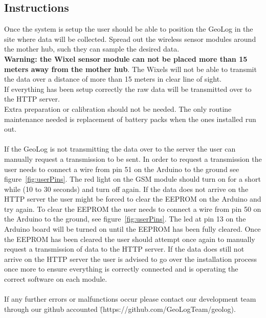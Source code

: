 \subsection{Instructions}
Once the system is setup the user should be able to position the GeoLog in the site where data will be collected. Spread out the wireless sensor modules around the mother hub, such they can sample the desired data.\\
\textbf{Warning: the Wixel sensor module can not be placed more than 15 meters away from the mother hub}. The Wixels will not be able to transmit the data over a distance of more than 15 meters in clear line of sight.\\
If everything has been setup correctly the raw data will be transmitted over to the HTTP server.\\
Extra preparation or calibration should not be needed. The only routine maintenance needed is replacement of battery packs when the ones installed run out.\\\\ %
If the GeoLog is not transmitting the data over to the server the user can manually request a transmission to be sent. In order to request a transmission the user needs to connect a wire from pin 51 on the Arduino to the ground see figure~\ref{fig:userPins}. The red light on the GSM module should turn on for a short while (10 to 30 seconds) and turn off again. If the data does not arrive on the HTTP server the user might be forced to clear the EEPROM on the Arduino and try again. To clear the EEPROM the user needs to connect a wire from pin 50 on the Arduino to the ground, see figure~\ref{fig:userPins}. The led at pin 13 on the Arduino board will be turned on until the EEPROM has been fully cleared. Once the EEPROM has been cleared the user should attempt once again to manually request a transmission of data to the HTTP server. If the data does still not arrive on the HTTP server the user is advised to go over the installation process once more to ensure everything is correctly connected and is operating the correct software on each module. 
\\
\\
If any further errors or malfunctions occur please contact our development team through our github accounted \u (https://github.com/GeoLogTeam/geolog).  

